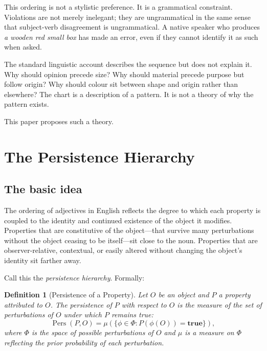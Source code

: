 \documentclass[11pt]{article}
\theoremstyle{rthm}
\theoremstyle{rdef}
\newtheorem{definition}[theorem]{Definition}
\theoremstyle{remark}
\newcommand{\Pers}{\operatorname{Pers}}
\begin{document}
This ordering is not a stylistic preference. It is a grammatical constraint.
Violations are not merely inelegant; they are ungrammatical in the same sense
that subject-verb disagreement is ungrammatical. A native speaker who
produces \emph{a wooden red small box} has made an error, even if they cannot
identify it as such when asked.

The standard linguistic account describes the sequence but does not explain
it. Why should opinion precede size? Why should material precede purpose but
follow origin? Why should colour sit between shape and origin rather than
elsewhere? The chart is a description of a pattern. It is not a theory of why
the pattern exists.

This paper proposes such a theory.

\section{The Persistence Hierarchy}
\label{sec:persistence}

\subsection{The basic idea}

The ordering of adjectives in English reflects the degree to which each
property is coupled to the identity and continued existence of the object it
modifies. Properties that are constitutive of the object---that survive many
perturbations without the object ceasing to be itself---sit close to the noun.
Properties that are observer-relative, contextual, or easily altered without
changing the object's identity sit farther away.

Call this the \emph{persistence hierarchy}. Formally:

\begin{definition}[Persistence of a Property]
\label{def:persistence}
Let $O$ be an object and $P$ a property attributed to $O$. The
\emph{persistence} of $P$ with respect to $O$ is the measure of the set of
perturbations of $O$ under which $P$ remains true:
\[
\Pers(P, O) = \mu\!\left(\{\phi \in \Phi : P(\phi(O)) = \mathbf{true}\}\right),
\]
where $\Phi$ is the space of possible perturbations of $O$ and $\mu$ is a
measure on $\Phi$ reflecting the prior probability of each perturbation.
\end{definition}
\end{document}
